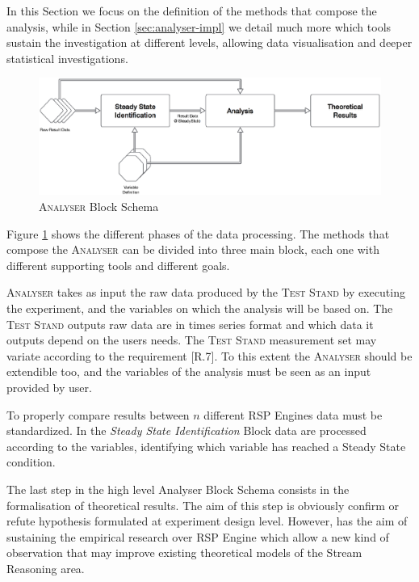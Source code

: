 In this Section we focus on the definition of the methods that compose the analysis, while in Section \ref{sec:analyser-impl} we detail much more which tools sustain the investigation at different levels, allowing data visualisation and deeper statistical investigations.

\begin{figure}[tbh]
  \centering
	\includegraphics[width=\linewidth]{images/analyser-block-schema}
	\caption{\textsc{Analyser} Block Schema} 
  	\label{fig:analyser-block-schema}
\end{figure}

Figure \ref{fig:analyser-block-schema} shows the different phases of the data processing. The methods that compose the \textsc{Analyser} can be divided into three main block, each one with different supporting tools and different goals.

\textsc{Analyser} takes as input the raw data produced by the \textsc{Test Stand} by executing the experiment, and the variables on which the analysis will be based on. The \textsc{Test Stand} outputs raw data are in times series format and which data it outputs depend on the users needs. The \textsc{Test Stand} measurement set may variate according to the requirement [R.7]. To this extent the \textsc{Analyser} should be extendible too, and the variables of the analysis must be seen as an input provided by \name user.

To properly compare results between $n$ different RSP Engines data must be standardized. In the \textit{Steady State Identification} Block data are processed according to the variables, identifying which variable has reached a Steady State condition.

The last step in the high level Analyser Block Schema consists in the formalisation of theoretical results. The aim of this step is obviously confirm or refute hypothesis formulated at experiment design level. However, \name has the aim of sustaining the empirical research over RSP Engine which allow a new kind of observation that may improve existing theoretical models of the Stream Reasoning area.

